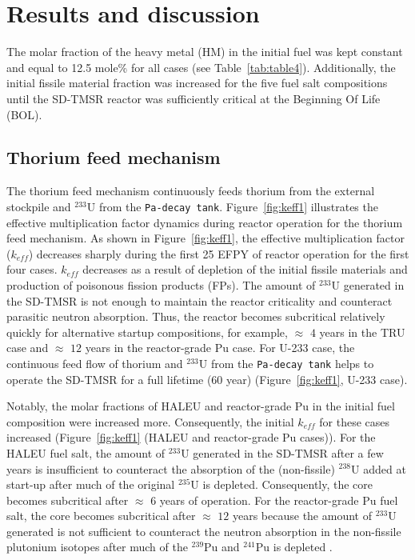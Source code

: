 \section{Results and discussion} \label{Results-and-discussion}
The molar fraction of the heavy metal (HM) 
in the initial fuel was kept constant and equal to 12.5 mole\% for all cases (see Table~\ref{tab:table4}). 
Additionally, the initial fissile material fraction was increased for the five fuel 
salt compositions until the SD-TMSR reactor was sufficiently critical at 
the Beginning Of Life (BOL).
\subsection{Thorium feed mechanism}
The thorium feed mechanism continuously feeds thorium from the external stockpile and 
$^{233}$U from the \texttt{Pa-decay tank}.
Figure~\ref{fig:keff1} illustrates the effective multiplication factor 
dynamics during reactor operation for the thorium feed mechanism. As shown in 
Figure~\ref{fig:keff1}, the effective multiplication factor ($k_{eff}$) 
decreases sharply during the first 25 \gls{EFPY} of reactor operation for the first 
four cases. $k_{eff}$ decreases as a result of depletion of the initial 
fissile materials and production of poisonous fission products (FPs). The amount of $^{233}$U generated in 
the SD-TMSR is not enough to maintain the reactor criticality and 
counteract parasitic neutron absorption. Thus, the 
reactor becomes subcritical relatively quickly for alternative startup 
compositions, for example, $\approx$ $4$ years in the \gls{TRU} case and $\approx$ $12$ 
years in the reactor-grade Pu case. For U-233 case, 
the continuous feed flow of thorium and $^{233}$U from the \texttt{Pa-decay tank} helps to operate the 
SD-TMSR for a full lifetime (60 year) (Figure~\ref{fig:keff1}, U-233 case).

Notably, the molar fractions of \gls{HALEU} and reactor-grade Pu in the initial fuel composition were increased
more. Consequently, the initial $k_{eff}$ for these cases increased (Figure~\ref{fig:keff1} (HALEU and reactor-grade Pu cases)).
For the HALEU fuel salt, the amount of $^{233}$U generated in the SD-TMSR after a few years is insufficient to counteract the absorption of the (non-fissile) $^{238}$U added at start-up after much of the original $^{235}$U is depleted. Consequently, the core becomes subcritical after $\approx$ $6$ years of operation.
For the reactor-grade Pu fuel salt, the core becomes subcritical after $\approx$ $12$ years because the amount of $^{233}$U generated is not sufficient to counteract the neutron absorption in the non-fissile plutonium isotopes after much of the $^{239}$Pu and $^{241}$Pu is depleted \cite{betzler2016modeling}.

